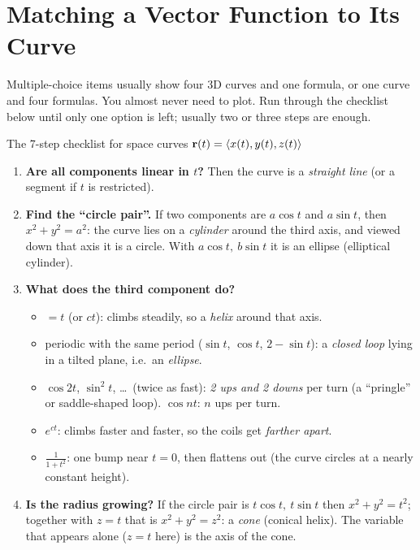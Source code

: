 \section{Matching a Vector Function to Its Curve}\label{ch:curves}

Multiple-choice items usually show four 3D curves and one formula, or one curve and four
formulas. You almost never need to plot. Run through the checklist below until only one
option is left; usually two or three steps are enough.

\begin{keybox}{The 7-step checklist for space curves $\mathbf{r}(t)=\left\langle x(t),y(t),z(t) \right\rangle$}
\begin{enumerate}
\item \textbf{Are all components linear in $t$?} Then the curve is a \emph{straight line}
  (or a segment if $t$ is restricted).
\item \textbf{Find the ``circle pair''.} If two components are $a\cos t$ and $a\sin t$, then
  $x^2+y^2=a^2$: the curve lies on a \emph{cylinder} around the third axis, and viewed down
  that axis it is a circle. With $a\cos t,\ b\sin t$ it is an ellipse (elliptical cylinder).
\item \textbf{What does the third component do?}
  \begin{itemize}
  \item $=t$ (or $ct$): climbs steadily, so a \emph{helix} around that axis.
  \item periodic with the same period ($\sin t$, $\cos t$, $2-\sin t$): a \emph{closed loop}
    lying in a tilted plane, i.e.\ an \emph{ellipse}.
  \item $\cos 2t$, $\sin^2t$, \dots\ (twice as fast): \emph{2 ups and 2 downs} per turn (a
    ``pringle'' or saddle-shaped loop). $\cos nt$: $n$ ups per turn.
  \item $e^{ct}$: climbs faster and faster, so the coils get \emph{farther apart}.
  \item $\frac1{1+t^2}$: one bump near $t=0$, then flattens out (the curve circles at a
    nearly constant height).
  \end{itemize}
\item \textbf{Is the radius growing?} If the circle pair is $t\cos t,\ t\sin t$ then
  $x^2+y^2=t^2$; together with $z=t$ that is $x^2+y^2=z^2$: a \emph{cone} (conical helix).
  The variable that appears alone ($z=t$ here) is the axis of the cone.

\end{enumerate}
\end{keybox}
